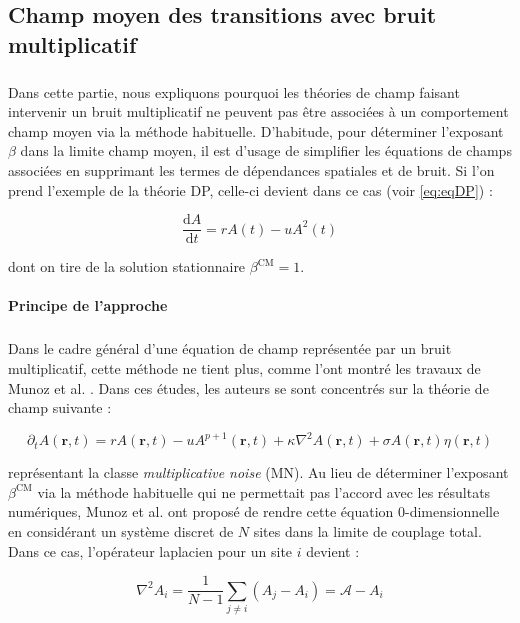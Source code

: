 \subsection{Champ moyen des transitions avec bruit multiplicatif}

\subparagraph{}Dans cette partie, nous expliquons pourquoi les théories de champ faisant intervenir un bruit multiplicatif ne peuvent pas être associées à un comportement champ moyen via la méthode habituelle. D'habitude, pour déterminer l'exposant $\beta$ dans la limite champ moyen, il est d'usage de simplifier les équations de champs associées en supprimant les termes de dépendances spatiales et de bruit. Si l'on prend l'exemple de la théorie DP, celle-ci devient dans ce cas (voir \autoref{eq:eqDP}) :

\begin{equation}
	\frac{\mathrm{d}A}{\mathrm{d}t} = rA(t) - u A^2(t)
\end{equation}

\noindent dont on tire de la solution stationnaire $\beta^\text{CM} = 1$.

\paragraph{Principe de l'approche}

\subparagraph{}Dans le cadre général d'une équation de champ représentée par un bruit multiplicatif, cette méthode ne tient plus, comme l'ont montré les travaux de Munoz et al. \cite{munoz_multiplicative_2003, munoz_multiplicative_2003}. Dans ces études, les auteurs se sont concentrés sur la théorie de champ suivante :

\begin{equation}
	\partial_t A(\mathbf{r}, t) = rA(\mathbf{r}, t) - uA^{p+1}(\mathbf{r}, t) + \kappa\nabla^2 A (\mathbf{r}, t) + \sigma A(\mathbf{r}, t) \eta(\mathbf{r}, t)
	\label{eq:eqMN}
\end{equation}

\noindent représentant la classe \textit{multiplicative noise} (MN). Au lieu de déterminer l'exposant $\beta^\text{CM}$ via la méthode habituelle qui ne permettait pas l'accord avec les résultats numériques, Munoz et al. ont proposé de rendre cette équation 0-dimensionnelle en considérant un système discret de $N$ sites dans la limite de couplage total. Dans ce cas, l'opérateur laplacien pour un site $i$ devient :

\begin{equation}
    \nabla^2 A_i = \frac{1}{N-1}\sum_{j\neq i}\left( A_j - A_i \right) = \mathcal{A} - A_i
\end{equation}

